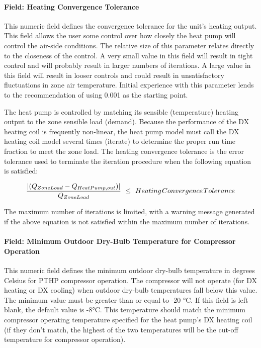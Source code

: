 \paragraph{Field: Heating Convergence Tolerance}\label{field-heating-convergence-tolerance-3}

This numeric field defines the convergence tolerance for the unit's heating output. This field allows the user some control over how closely the heat pump will control the air-side conditions. The relative size of this parameter relates directly to the closeness of the control. A very small value in this field will result in tight control and will probably result in larger numbers of iterations. A large value in this field will result in looser controls and could result in unsatisfactory fluctuations in zone air temperature. Initial experience with this parameter lends to the recommendation of using 0.001 as the starting point.

The heat pump is controlled by matching its sensible (temperature) heating output to the zone sensible load (demand). Because the performance of the DX heating coil is frequently non-linear, the heat pump model must call the DX heating coil model several times (iterate) to determine the proper run time fraction to meet the zone load. The heating convergence tolerance is the error tolerance used to terminate the iteration procedure when the following equation is satisfied:

\begin{equation}
\frac{{\left| {({Q_{ZoneLoad}} - {Q_{HeatPump,out}})} \right|}}{{{Q_{ZoneLoad}}}}\,\, \le \,\,Heating{\kern 1pt} Convergence{\kern 1pt} Tolerance
\end{equation}

The maximum number of iterations is limited, with a warning message generated if the above equation is not satisfied within the maximum number of iterations.

\paragraph{Field: Minimum Outdoor Dry-Bulb Temperature for Compressor Operation}\label{field-minimum-outdoor-dry-bulb-temperature-for-compressor-operation-001}

This numeric field defines the minimum outdoor dry-bulb temperature in degrees Celsius for PTHP compressor operation. The compressor will not operate (for DX heating or DX cooling) when outdoor dry-bulb temperatures fall below this value. The minimum value must be greater than or equal to -20 °C. If this field is left blank, the default value is -8°C. This temperature should match the minimum compressor operating temperature specified for the heat pump's DX heating coil (if they don't match, the highest of the two temperatures will be the cut-off temperature for compressor operation).

